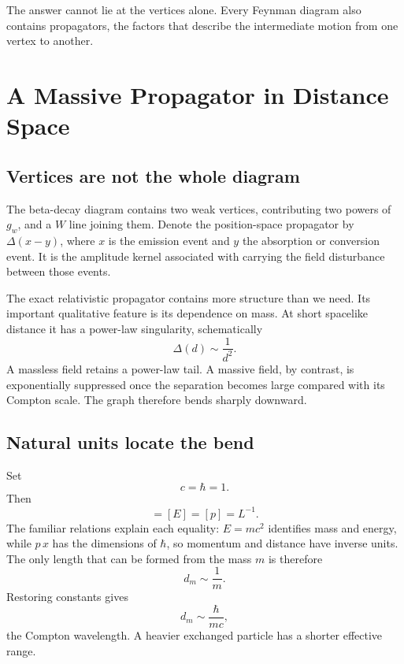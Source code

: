 The answer cannot lie at the vertices alone. Every Feynman diagram also
contains propagators, the factors that describe the intermediate motion from
one vertex to another.

\section{A Massive Propagator in Distance Space}

\subsection{Vertices are not the whole diagram}

The beta-decay diagram contains two weak vertices, contributing two powers of
\(g_w\), and a \(W\) line joining them. Denote the position-space propagator
by \(\Delta(x-y)\), where \(x\) is the emission event and \(y\) the absorption
or conversion event. It is the amplitude kernel associated with carrying the
field disturbance between those events.

The exact relativistic propagator contains more structure than we need. Its
important qualitative feature is its dependence on mass. At short spacelike
distance it has a power-law singularity, schematically
\begin{equation}
  \Delta(d)\sim\frac1{d^2}.
\end{equation}
A massless field retains a power-law tail. A massive field, by contrast, is
exponentially suppressed once the separation becomes large compared with its
Compton scale. The graph therefore bends sharply downward.

\subsection{Natural units locate the bend}

Set
\begin{equation}
  c=\hbar=1.
\end{equation}
Then
\begin{equation}
  [m]=[E]=[p]=L^{-1}.
\end{equation}
The familiar relations explain each equality: \(E=mc^2\) identifies mass and
energy, while \(p\,x\) has the dimensions of \(\hbar\), so momentum and
distance have inverse units. The only length that can be formed from the mass
\(m\) is therefore
\begin{equation}
  d_m\sim\frac1m.
\end{equation}
Restoring constants gives
\begin{equation}
  d_m\sim\frac{\hbar}{mc},
\end{equation}
the Compton wavelength. A heavier exchanged particle has a shorter effective
range.

